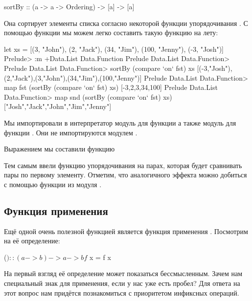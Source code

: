 \begin{code}
sortBy :: (a -> a -> Ordering) -> [a] -> [a]
\end{code}

Она сортирует элементы списка согласно некоторой
функции упорядочивания .
С помощью функции  мы можем легко составить такую
функцию на лету:

\begin{code}
let xs = [(3, "John"), (2, "Jack"), (34, "Jim"), (100, "Jenny"), (-3, "Josh")]  
Prelude> :m +Data.List Data.Function
Prelude Data.List Data.Function> 
Prelude Data.List Data.Function> sortBy (compare `on` fst) xs
[(-3,"Josh"),(2,"Jack"),(3,"John"),(34,"Jim"),(100,"Jenny")]
Prelude Data.List Data.Function> map fst (sortBy (compare `on` fst) xs)
[-3,2,3,34,100]
Prelude Data.List Data.Function> map snd (sortBy (compare `on` fst) xs)
["Josh","Jack","John","Jim","Jenny"]
\end{code}

Мы импортировали в интерпретатор модуль  для функции
 а также модуль  для функции .
Они не импортируются модулем .

Выражением  мы составили функцию 


Тем самым ввели функцию упорядочивания на парах, которая 
будет сравнивать пары по первому элементу.
Отметим, что аналогичного эффекта можно добиться
с помощью функции  из модуля .


\subsection{Функция применения}

Ещё одной очень полезной функцией является функция применения \In{($)}.
Посмотрим на её определение:

\begin{code}
($) :: (a -> b) -> a -> b
f $ x  =  f x
\end{code}

На первый взгляд её определение может показаться бессмысленным.
Зачем нам специальный знак для применения, если у нас уже есть
пробел? Для ответа на этот вопрос нам придётся 
познакомиться с приоритетом инфиксных операций.

